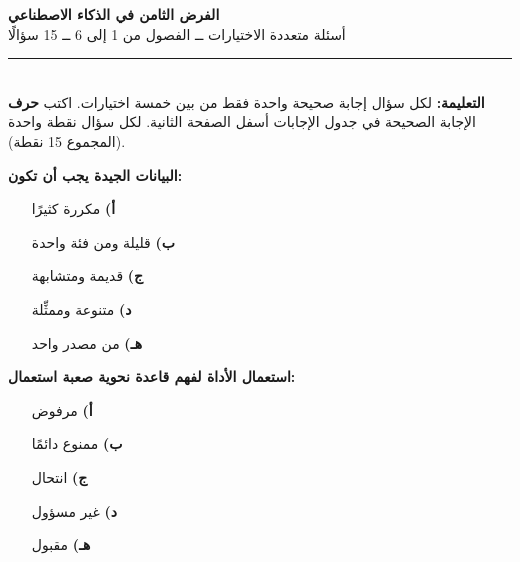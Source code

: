 \documentclass[11pt,a4paper]{article}
\begin{document}
\begin{center}
{\Large\khatt\textbf{الفرض الثامن في الذكاء الاصطناعي}}\\[2pt]
{\normalsize أسئلة متعددة الاختيارات ــ الفصول من 1 إلى 6 ــ 15 سؤالًا}
\end{center}
\vspace{-4pt}\rule{\textwidth}{0.6pt}\\
{\small\textbf{التعليمة:} لكل سؤال إجابة صحيحة واحدة فقط من بين خمسة اختيارات.
اكتب \textbf{حرف} الإجابة الصحيحة في جدول الإجابات أسفل الصفحة الثانية.
لكل سؤال نقطة واحدة (المجموع 15 نقطة).}
\vspace{-2pt}
\begin{multicols}{2}

\noindent\begin{minipage}{\linewidth}
\hangindent=0.7cm\textbf{البيانات الجيدة يجب أن تكون:}
\begin{itemize}[leftmargin=0.95cm, labelsep=4pt, itemsep=0pt, topsep=2pt, parsep=0pt]
  \item[\textbf{أ)}] مكررة كثيرًا
  \item[\textbf{ب)}] قليلة ومن فئة واحدة
  \item[\textbf{ج)}] قديمة ومتشابهة
  \item[\textbf{د)}] متنوعة وممثِّلة
  \item[\textbf{هـ)}] من مصدر واحد
\end{itemize}
\end{minipage}\par\vspace{7pt plus 4pt}
\noindent\begin{minipage}{\linewidth}
\hangindent=0.7cm\textbf{استعمال الأداة لفهم قاعدة نحوية صعبة استعمال:}
\begin{itemize}[leftmargin=0.95cm, labelsep=4pt, itemsep=0pt, topsep=2pt, parsep=0pt]
  \item[\textbf{أ)}] مرفوض
  \item[\textbf{ب)}] ممنوع دائمًا
  \item[\textbf{ج)}] انتحال
  \item[\textbf{د)}] غير مسؤول
  \item[\textbf{هـ)}] مقبول
\end{itemize}
\end{minipage}\par\vspace{7pt plus 4pt}
\noindent\begin{minipage}{\linewidth}

\end{minipage}
\end{multicols}
\end{document}
